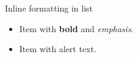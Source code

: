 \documentclass[14pt,t]{beamer}
\begin{document}
\begin{frame}{Inline formatting in list}
\begin{itemize}
\item Item with \textbf{bold} and \emph{emphasis}.
\item Item with \alert{alert text}.
\end{itemize}
\end{frame}
\end{document}
